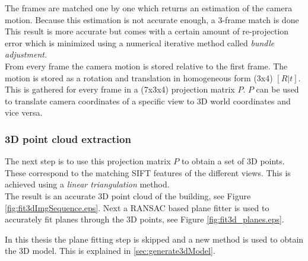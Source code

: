 The frames are matched one by one which returns an estimation of the camera
motion. Because this estimation is not accurate enough, a 3-frame match is done 
This result is more accurate but comes with a certain
amount of re-projection error which is minimized using a numerical
iterative method called \emph{bundle adjustment}.  \\

From every frame the camera motion is stored relative to the first frame.
The motion is stored as a rotation and translation in homogeneous
form (3x4) $[R|t]$. This is gathered for every frame in a (7x3x4) projection matrix $P$.
$P$ can be used to translate camera coordinates of a specific view 
 to 3D world coordinates and vice versa.

\subsubsection{3D point cloud extraction}
The next step is to use this projection matrix $P$ to obtain a set of 3D points.
These correspond to the matching SIFT features of the different views.  This
is achieved using a \emph{linear triangulation} method. \\
The result is an accurate 3D point cloud of the building, see Figure
\ref{fig:fit3dImgSequence.eps}.
Next a RANSAC based plane fitter is used to accurately fit planes through
the 3D points, see Figure \ref{fig:fit3d_planes.eps}.\\

In this thesis the plane fitting step is skipped and a new method is
used to obtain the 3D model. This is explained in \ref{sec:generate3dModel}.

% 




